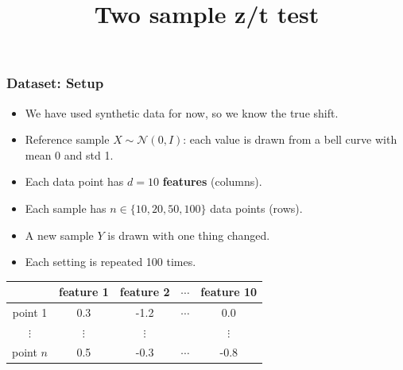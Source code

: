 \documentclass{beamer}
\title{Two sample z/t test}
\author{}
\date{}
\begin{document}
\frame{\titlepage}

\begin{frame}[t]
\frametitle{Dataset: Setup}
\begin{itemize}
    \item We have used synthetic data for now, so we know the true shift.
    \item Reference sample $X \sim \mathcal{N}(0, I)$: each value is drawn from a bell curve with mean 0 and std 1.
    \item Each data point has $d = 10$ \textbf{features} (columns).
    \item Each sample has $n \in \{10, 20, 50, 100\}$ data points (rows).
    \item A new sample $Y$ is drawn with one thing changed.
    \item Each setting is repeated 100 times.
\end{itemize}
\vspace{0.3cm}
\centering
\begin{tabular}{c|cccc}
         & feature 1 & feature 2 & $\cdots$ & feature 10 \\ \hline
point 1  & 0.3  & -1.2 & $\cdots$ & 0.0 \\
$\vdots$ & $\vdots$ & $\vdots$ & & $\vdots$ \\
point $n$ & 0.5 & -0.3 & $\cdots$ & -0.8 \\
\end{tabular}
\end{frame}
\end{document}
